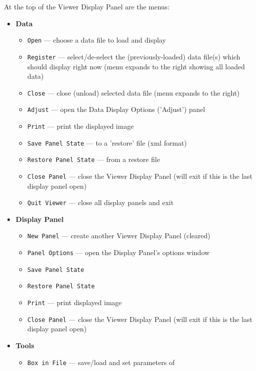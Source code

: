 At the top of the Viewer Display Panel are the menus:
\begin{itemize}
\item {\bf Data}
  \begin{itemize}
      \item  {\tt Open} --- choose a data file to load and display
      \item  {\tt Register} --- select/de-select the (previously-loaded)
             data file(s) which should display right now (menu expands
	     to the right showing all loaded data) 
      \item  {\tt Close} --- close (unload) selected data file (menu
             expands to the right)
      \item  {\tt Adjust} --- open the Data Display Options ('Adjust') panel 
      \item  {\tt Print} --- print the displayed image
      \item  {\tt Save Panel State} --- to a 'restore' file (xml format)
      \item  {\tt Restore Panel State} --- from a restore file
      \item  {\tt Close Panel} --- close the Viewer Display Panel (will exit
             if this is the last display panel open)
      \item  {\tt Quit Viewer} --- close all display panels and exit
  \end{itemize}
\item {\bf Display Panel}
  \begin{itemize}
      \item {\tt New Panel} --- create another Viewer Display Panel (cleared)
      \item {\tt Panel Options} --- open the Display Panel's options window
      \item  {\tt Save Panel State}
      \item  {\tt Restore Panel State}
      \item {\tt Print} --- print displayed image
      \item {\tt Close Panel} --- close the Viewer Display Panel (will exit if
            this is the last display panel open)
  \end{itemize}
\item {\bf Tools}
  \begin{itemize}
     \item {\tt Box in File}  --- save/load and set parameters of

\end{itemize}
\end{itemize}
